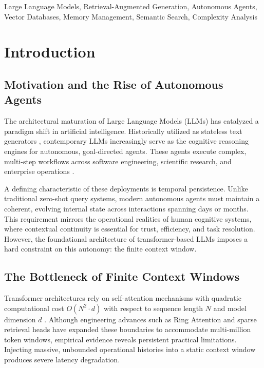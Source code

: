 \documentclass[conference]{IEEEtran}
\begin{document}
\begin{IEEEkeywords}
Large Language Models, Retrieval-Augmented Generation, Autonomous Agents, Vector Databases, Memory Management, Semantic Search, Complexity Analysis
\end{IEEEkeywords}

\section{Introduction}
\label{sec:intro}

\subsection{Motivation and the Rise of Autonomous Agents}
The architectural maturation of Large Language Models (LLMs) has catalyzed a paradigm shift in artificial intelligence. Historically utilized as stateless text generators \cite{zhao2023survey}, contemporary LLMs increasingly serve as the cognitive reasoning engines for autonomous, goal-directed agents. These agents execute complex, multi-step workflows across software engineering, scientific research, and enterprise operations \cite{wang2023survey}.

A defining characteristic of these deployments is temporal persistence. Unlike traditional zero-shot query systems, modern autonomous agents must maintain a coherent, evolving internal state across interactions spanning days or months. This requirement mirrors the operational realities of human cognitive systems, where contextual continuity is essential for trust, efficiency, and task resolution. However, the foundational architecture of transformer-based LLMs imposes a hard constraint on this autonomy: the finite context window.

\subsection{The Bottleneck of Finite Context Windows}
Transformer architectures rely on self-attention mechanisms with quadratic computational cost $O(N^2 \cdot d)$ with respect to sequence length $N$ and model dimension $d$ \cite{vaswani2017attention, ding2024longcontext}. Although engineering advances such as Ring Attention and sparse retrieval heads have expanded these boundaries to accommodate multi-million token windows, empirical evidence reveals persistent practical limitations. Injecting massive, unbounded operational histories into a static context window produces severe latency degradation.
\end{document}
